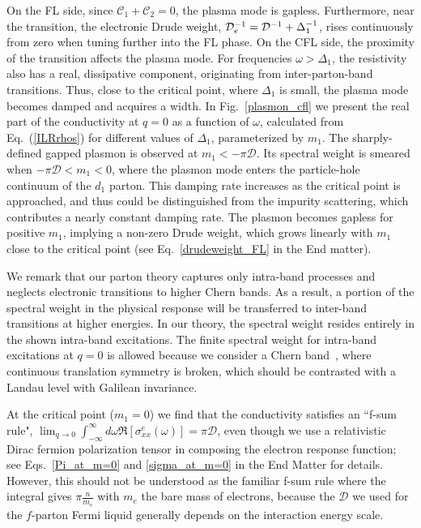\documentclass[aps,prl,twocolumn,superscriptaddress,floatfix, 10pt,longbibliography, nofootinbib]{revtex4-2}
\begin{document}
On the FL side, since $\mathcal{C}_1+\mathcal{C}_2=0$, the plasma mode is gapless. Furthermore, near the transition, the electronic Drude weight, ${\cal D}_e^{-1}={\cal D}^{-1}+\Delta_1^{-1}$, rises continuously from zero when tuning further into the FL phase. On the CFL side, the proximity of the transition affects the plasma mode. For frequencies $\omega>\Delta_1$, the resistivity also has a real, dissipative component, originating from inter-parton-band transitions.
Thus, close to the critical point, where $\Delta_1$ is small, the plasma mode becomes damped and acquires a width.
In Fig.~\ref{plasmon_cfl} we present the real part of the conductivity at $q=0$ as a function of $\omega$, calculated from Eq.~(\ref{ILRrhos}) for different values of $\Delta_1$, parameterized by $m_1$. The sharply-defined gapped plasmon is observed at $m_1<-\pi\mathcal{D}$. Its spectral weight is smeared when $-\pi\mathcal{D}<m_1<0$, where the plasmon mode enters the particle-hole continuum of the $d_1$ parton. This damping rate increases as the critical point is approached, and thus could be distinguished from the impurity scattering, which contributes a nearly constant damping rate. The plasmon becomes gapless for positive $m_1$, implying a non-zero Drude weight, which grows linearly with $m_1$ close to the critical point (see Eq.~\eqref{drudeweight_FL} in the End matter).

We remark that our parton theory captures only intra-band processes and neglects electronic transitions to higher Chern bands. As a result, a portion of the spectral weight in the physical response will be transferred to inter-band transitions at higher energies. In our theory, the spectral weight resides entirely in the shown intra-band excitations.
The finite spectral weight for intra-band excitations at $q=0$ is allowed because we consider a Chern band~\cite{Wu_moire_2016, paul_shining_2025, shen_magnetorotons_2025, kousa_theory_2025}, where continuous translation symmetry is broken, which should be contrasted with a Landau level with Galilean invariance.


















At the critical point ($m_1=0$) we find that the conductivity satisfies an ``f-sum rule", $\lim_{q\rightarrow 0}\int_{-\infty}^{\infty}d\omega \Re[\sigma^e_{xx}(\omega)]=\pi \mathcal{D}$, even though we use a relativistic Dirac fermion polarization tensor in composing the electron response function; see Eqs.~\eqref{Pi_at_m=0} and \eqref{sigma_at_m=0} in the End Matter for details. However, this should not be understood as the familiar f-sum rule where the integral gives $\pi \frac{n}{m_e}$ with $m_e$ the bare mass of electrons, because the $\mathcal{D}$ we used for the $f$-parton Fermi liquid generally depends on the interaction energy scale.
\end{document}
